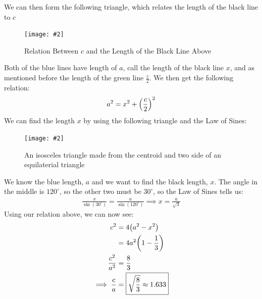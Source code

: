 \documentclass[12pt]{article}
\newcommand{\fig}[3]{
  \begin{figure}[H]
    \centering\texttt{[image: \#2]}\caption{#3}
  \end{figure}}
\begin{document}
We can then form the following triangle, which relates the length of the black line to $c$

\fig{6.0}{hcp3.png}{Relation Between $c$ and the Length of the Black Line Above}

Both of the blue lines have length of $a$, call the length of the black line $x$, and as mentioned before the length of the green line $\frac{c}{2}$. We then get the following relation:
\begin{align*}
  a^2=x^2+\qty(\frac{c}{2})^2
\end{align*}
We can find the length $x$ by using the following triangle and the Law of Sines:

\fig{6.0}{hcp4.png}{An isosceles triangle made from the centroid and two side of an equilaterial triangle}

We know the blue length, $a$ and we want to find the black length, $x$. The angle in the middle is $120^\circ$, so the other two must be $30^\circ$, so the Law of Sines tells us:
\begin{align*}
  \frac{x}{\sin(30^\circ)}=\frac{a}{\sin(120^\circ)}\implies x=\frac{a}{\sqrt{3}}
\end{align*}
Using our relation above, we can now see:
\begin{align*}
  c^2&=4\qty(a^2-x^2)\\
  &=4a^2\qty(1-\frac{1}{3})\\
  \frac{c^2}{a^2}&=\frac{8}{3}\\
  \implies\frac{c}{a}&=\boxed{\sqrt{\frac{8}{3}}\approx 1.633}
\end{align*}
\end{document}
